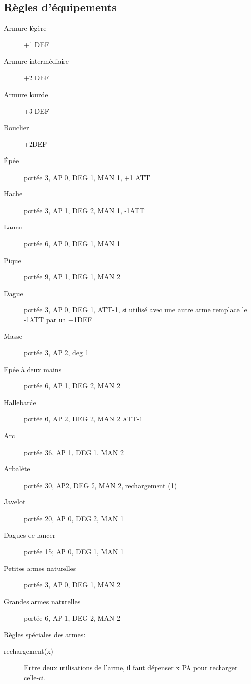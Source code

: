 \documentclass[10pt,a4paper]{article}
\begin{document}
\begin{multicols}{3}
\section*{Règles d'équipements}
\begin{description}
\item[Armure légère]+1 DEF
\item[Armure intermédiaire] +2 DEF
\item[Armure lourde]+3 DEF
\item[Bouclier] +2DEF
\item[Épée]portée 3, AP 0, DEG 1, MAN 1, +1 ATT
\item[Hache]portée 3, AP 1, DEG 2, MAN 1, -1ATT
\item[Lance]portée 6, AP 0, DEG 1, MAN 1
\item[Pique]portée 9, AP 1, DEG 1, MAN 2
\item[Dague]portée 3, AP 0, DEG 1, ATT-1, si utilisé avec une autre arme remplace le -1ATT par un +1DEF
\item[Masse]portée 3, AP 2, deg 1
\item[Epée à deux mains]portée 6, AP 1, DEG 2, MAN 2
\item[Hallebarde]portée 6, AP 2, DEG 2, MAN 2 ATT-1
\item[Arc] portée 36, AP 1, DEG 1, MAN 2
\item[Arbalète]portée 30, AP2, DEG 2, MAN 2, rechargement (1)
\item[Javelot]portée 20, AP 0, DEG 2, MAN 1
\item[Dagues de lancer]portée 15; AP 0, DEG 1, MAN 1
\item[Petites armes naturelles]portée 3, AP 0, DEG 1, MAN 2
\item[Grandes armes naturelles]portée 6, AP 1, DEG 2, MAN 2
\end{description}
Règles spéciales des armes:
\begin{description}
\item[rechargement(x)]Entre deux utilisations de l'arme, il faut dépenser x PA pour recharger celle-ci.
\end{description}
\end{multicols}
\end{document}
